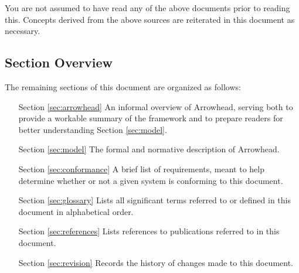 You are not assumed to have read any of the above documents prior to reading this.
Concepts derived from the above sources are reiterated in this document as necessary.

\newpage

\subsection{Section Overview}
\label{sec:introduction:sections}

The remaining sections of this document are organized as follows:
\vspace*{2mm}
\begin{itemize}[leftmargin=2cm,rightmargin=0pt,labelwidth=2cm,labelsep=0pt,itemindent=0pt,parsep=0.1cm,topsep=0.1cm,align=left]


\item[Section \ref{sec:arrowhead}]
An informal overview of Arrowhead, serving both to provide a workable summary of the framework and to prepare readers for better understanding Section \ref{sec:model}.

\item[Section \ref{sec:model}]
The formal and normative description of Arrowhead.

\item[Section \ref{sec:conformance}]
A brief list of requirements, meant to help determine whether or not a given system is conforming to this document.

\item[Section \ref{sec:glossary}]
Lists all significant terms referred to or defined in this document in alphabetical order.

\item[Section \ref{sec:references}]
Lists references to publications referred to in this document.

\item[Section \ref{sec:revision}]
Records the history of changes made to this document.

\end{itemize}
